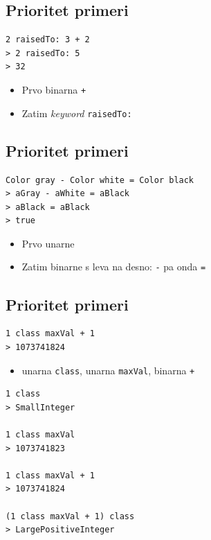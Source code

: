\documentclass[presentation]{beamer}
\begin{document}
\subsection{Prioritet primeri}
\label{sec:org9487480}

\begin{verbatim}
2 raisedTo: 3 + 2
> 2 raisedTo: 5
> 32
\end{verbatim}

\begin{itemize}
\item Prvo binarna \texttt{+}
\item Zatim \emph{keyword} \texttt{raisedTo:}
\end{itemize}

\subsection{Prioritet primeri}
\label{sec:org701372b}

\begin{verbatim}
Color gray - Color white = Color black
> aGray - aWhite = aBlack
> aBlack = aBlack
> true
\end{verbatim}

\begin{itemize}
\item Prvo unarne
\item Zatim binarne s leva na desno: \texttt{-} pa onda \texttt{=}
\end{itemize}

\subsection{Prioritet primeri}
\label{sec:org172aa31}

\begin{verbatim}
1 class maxVal + 1
> 1073741824
\end{verbatim}

\begin{itemize}
\item unarna \texttt{class}, unarna \texttt{maxVal}, binarna \texttt{+}
\end{itemize}

\begin{verbatim}
1 class
> SmallInteger

1 class maxVal
> 1073741823

1 class maxVal + 1
> 1073741824

(1 class maxVal + 1) class
> LargePositiveInteger
\end{verbatim}
\end{document}
